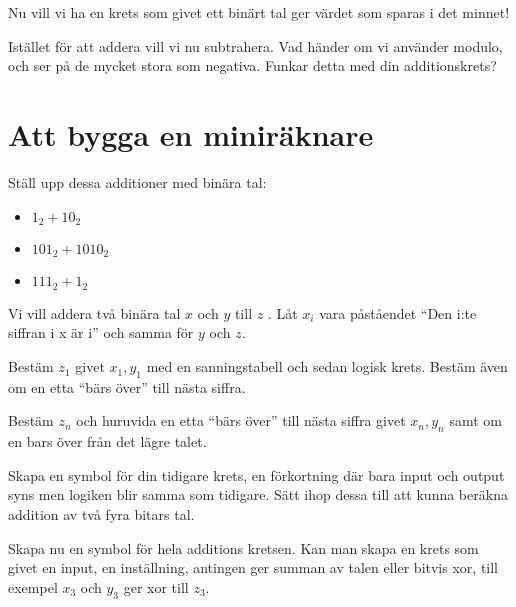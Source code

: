 \begin{problem}
	Nu vill vi ha en krets som givet ett binärt tal ger värdet som sparas i det minnet!
\end{problem}

\begin{problem}
	Istället för att addera vill vi nu subtrahera. Vad händer om vi använder modulo, och ser på de mycket stora som negativa. Funkar detta med din additionskrets?
\end{problem}


\section*{Att bygga en miniräknare}

\begin{problem}
	Ställ upp dessa additioner med binära tal:
	\begin{itemize}
		\item \(1_2 + 10_2\) 
		\item \(101_2 + 1010_2\) 
		\item \(111_2 + 1_2\) 
	\end{itemize}
\end{problem}


	Vi vill addera två binära tal \(x\) och \(y\) till \(z\) . Låt \(x_i\) vara påståendet ``Den i:te siffran i x är i'' och samma för \(y\) och \(z\). 

\begin{problem}
	Bestäm \(z_1\) givet \(x_1, y_1\) med en sanningstabell och sedan logisk krets. Bestäm även om en etta ``bärs över'' till nästa siffra.
\end{problem}

\begin{problem}
	Bestäm \(z_n\) och huruvida en etta ``bärs över'' till nästa siffra givet \(x_n, y_n\) samt om en bars över från det lägre talet.  
\end{problem}

\begin{problem}
	Skapa en symbol för din tidigare krets, en förkortning där bara input och output syns men logiken blir samma som tidigare. Sätt ihop dessa till att kunna beräkna addition av två fyra bitars tal.
\end{problem}

\begin{problem}
	Skapa nu en symbol för hela additions kretsen. Kan man skapa en krets som givet en input, en inställning, antingen ger summan av talen eller bitvis xor, till exempel \(x_3\) och \(y_3\) ger xor till \(z_3\).
\end{problem}

